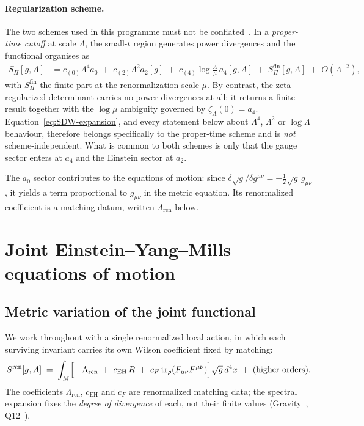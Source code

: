 \documentclass[12pt,a4paper]{article}
\theoremstyle{remark}
\begin{document}
      \paragraph{Regularization scheme.}
      The two schemes used in this programme must not be conflated~\cite{Beau2026h}.
      In a \emph{proper-time cutoff} at scale $\Lambda$, the small-$t$ region generates power
      divergences and the functional organises as
      \begin{align}
        S_\Pi[g,A]
        &= c_{(0)}\Lambda^4 a_0
        \;+\;
        c_{(2)}\Lambda^2 a_2[g]
        \;+\;
        c_{(4)}\log\frac{\Lambda}{\mu}\,a_4[g,A]
        \;+\;
        S_\Pi^{\mathrm{fin}}[g,A]
        \;+\;
        O\!\left(\Lambda^{-2}\right),
        \label{eq:SDW-expansion}
      \end{align}
      with $S_\Pi^{\mathrm{fin}}$ the finite part at the renormalization scale $\mu$.
      By contrast, the zeta-regularized determinant carries no power divergences at all: it
      returns a finite result together with the $\log\mu$ ambiguity governed by $\zeta_A(0)=a_4$.
      Equation~\eqref{eq:SDW-expansion}, and every statement below about $\Lambda^4$, $\Lambda^2$
      or $\log\Lambda$ behaviour, therefore belongs specifically to the proper-time scheme and is
      \emph{not} scheme-independent.
      What is common to both schemes is only that the gauge sector enters at $a_4$ and the
      Einstein sector at $a_2$.

      The $a_0$ sector contributes to the equations of motion: since
      $\delta\sqrt{g}/\delta g^{\mu\nu} = -\tfrac12\sqrt{g}\,g_{\mu\nu}$, it yields a term
      proportional to $g_{\mu\nu}$ in the metric equation.
      Its renormalized coefficient is a matching datum, written $\Lambda_{\mathrm{ren}}$ below.

  \section{Joint Einstein--Yang--Mills equations of motion}
    \label{sec:EYM}

    \subsection{Metric variation of the joint functional}
      \label{ssec:metric-var}

      We work throughout with a single renormalized local action, in which each surviving
      invariant carries its own Wilson coefficient fixed by matching:
      \begin{equation}
        S^{\mathrm{ren}}[g,A]
        \;=\;
        \int_M \Bigl[
          -\,\Lambda_{\mathrm{ren}}
          \;+\; c_{\mathrm{EH}}\,R
          \;+\; c_F\,\mathrm{tr}_\rho(F_{\mu\nu}F^{\mu\nu})
        \Bigr]\sqrt{g}\,d^4x
        \;+\;\text{(higher orders)}.
        \label{eq:ren-action}
      \end{equation}
      The coefficients $\Lambda_{\mathrm{ren}}$, $c_{\mathrm{EH}}$ and $c_F$ are renormalized
      matching data; the spectral expansion fixes the \emph{degree of divergence} of each, not
      their finite values (Gravity~\cite{Beau2026h}, Q12~\cite{Beau2026q12}).
\end{document}
